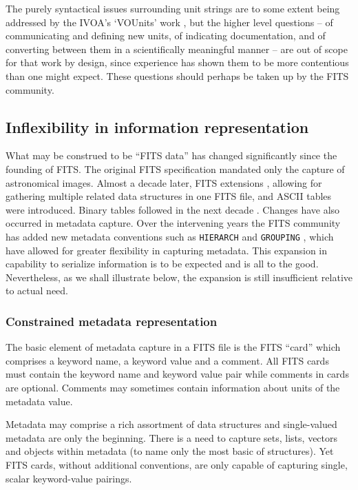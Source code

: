 \documentclass[final,authoryear,5p,times,twocolumn]{elsarticle}
\begin{document}
{{The purely syntactical issues surrounding unit strings are to some
extent being addressed by the IVOA's `VOUnits' work \citep{VOUnits}, but the higher
level questions -- of communicating and defining new units, of
indicating documentation, and of converting between them in a
scientifically meaningful manner -- are out of scope for that work by
design, since experience has shown them to be more contentious than
one might expect.  These questions should perhaps be taken up by the FITS community.


\subsection{Inflexibility in information representation}
\label{section_inflex_represent}


What may be construed to be ``FITS data'' has changed significantly
since the founding of FITS. The original FITS specification mandated
only the capture of astronomical images. Almost a decade later, FITS
extensions \citep{1988A&AS...73..359G}, allowing for gathering
multiple related data structures in one FITS file, and ASCII tables
\citep{1988A&AS...73..365H} were introduced. Binary tables followed in
the next decade \citep{1995A&AS..113..159C}. Changes have also
occurred in metadata capture. Over the intervening years the FITS
community has added new metadata conventions such as \texttt{HIERARCH}
\citep{2009Wic} and \texttt{GROUPING} \citep{2007Jen,1995ASPC...77..229J}, which have
allowed for greater flexibility in capturing metadata.
This expansion in capability to serialize information is to be 
expected and is all to the good. Nevertheless, as we shall illustrate 
below, the expansion is still insufficient relative to actual need.


\subsubsection{Constrained metadata representation}
\label{subsection_information_representation}


The basic element of metadata capture in a FITS file is the FITS
``card'' which comprises a keyword name, a keyword value and a
comment. All FITS cards must contain the keyword name and keyword
value pair while comments in cards are optional. Comments may
sometimes contain information about units of the metadata value.

Metadata may comprise a rich assortment of data structures and
single-valued metadata are only the beginning. There is a need to
capture sets, lists, vectors and objects within metadata (to name only
the most basic of structures). Yet FITS cards, without additional
conventions, are only capable of capturing single, scalar keyword-value 
pairings. 

}}
\end{document}
